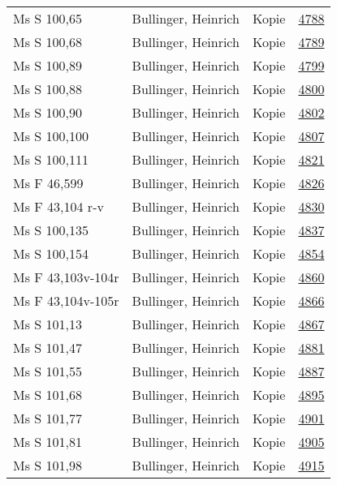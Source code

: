 \documentclass[10pt,a4paper,landscape]{report}
\begin{document}
\begin{longtable}{p{16cm}p{4cm}lr}
Ms S 100,65	&	Bullinger, Heinrich	&	Kopie	&	\href{http://130.60.24.72/assignment/4788}{4788}\\
Ms S 100,68	&	Bullinger, Heinrich	&	Kopie	&	\href{http://130.60.24.72/assignment/4789}{4789}\\
Ms S 100,89	&	Bullinger, Heinrich	&	Kopie	&	\href{http://130.60.24.72/assignment/4799}{4799}\\
Ms S 100,88	&	Bullinger, Heinrich	&	Kopie	&	\href{http://130.60.24.72/assignment/4800}{4800}\\
Ms S 100,90	&	Bullinger, Heinrich	&	Kopie	&	\href{http://130.60.24.72/assignment/4802}{4802}\\
Ms S 100,100	&	Bullinger, Heinrich	&	Kopie	&	\href{http://130.60.24.72/assignment/4807}{4807}\\
Ms S 100,111	&	Bullinger, Heinrich	&	Kopie	&	\href{http://130.60.24.72/assignment/4821}{4821}\\
Ms F 46,599	&	Bullinger, Heinrich	&	Kopie	&	\href{http://130.60.24.72/assignment/4826}{4826}\\
Ms F 43,104 r-v	&	Bullinger, Heinrich	&	Kopie	&	\href{http://130.60.24.72/assignment/4830}{4830}\\
Ms S 100,135	&	Bullinger, Heinrich	&	Kopie	&	\href{http://130.60.24.72/assignment/4837}{4837}\\
Ms S 100,154	&	Bullinger, Heinrich	&	Kopie	&	\href{http://130.60.24.72/assignment/4854}{4854}\\
Ms F 43,103v-104r	&	Bullinger, Heinrich	&	Kopie	&	\href{http://130.60.24.72/assignment/4860}{4860}\\
Ms F 43,104v-105r	&	Bullinger, Heinrich	&	Kopie	&	\href{http://130.60.24.72/assignment/4866}{4866}\\
Ms S 101,13	&	Bullinger, Heinrich	&	Kopie	&	\href{http://130.60.24.72/assignment/4867}{4867}\\
Ms S 101,47	&	Bullinger, Heinrich	&	Kopie	&	\href{http://130.60.24.72/assignment/4881}{4881}\\
Ms S 101,55	&	Bullinger, Heinrich	&	Kopie	&	\href{http://130.60.24.72/assignment/4887}{4887}\\
Ms S 101,68	&	Bullinger, Heinrich	&	Kopie	&	\href{http://130.60.24.72/assignment/4895}{4895}\\
Ms S 101,77	&	Bullinger, Heinrich	&	Kopie	&	\href{http://130.60.24.72/assignment/4901}{4901}\\
Ms S 101,81	&	Bullinger, Heinrich	&	Kopie	&	\href{http://130.60.24.72/assignment/4905}{4905}\\
Ms S 101,98	&	Bullinger, Heinrich	&	Kopie	&	\href{http://130.60.24.72/assignment/4915}{4915}\\

\end{longtable}
\end{document}
